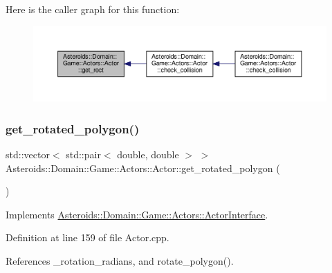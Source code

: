 Here is the caller graph for this function\+:\nopagebreak
\begin{figure}[H]
\begin{center}
\leavevmode
\includegraphics[width=350pt]{classAsteroids_1_1Domain_1_1Game_1_1Actors_1_1Actor_a445d9ee9ca02625b5385727aa4cbab1b_icgraph}
\end{center}
\end{figure}
\mbox{\label{classAsteroids_1_1Domain_1_1Game_1_1Actors_1_1Actor_a8518140e16304bd6cf7a8bc6a99c9509}} 
\subsubsection{\texorpdfstring{get\+\_\+rotated\+\_\+polygon()}{get\_rotated\_polygon()}}
{\footnotesize\ttfamily std\+::vector$<$ std\+::pair$<$ double, double $>$ $>$ Asteroids\+::\+Domain\+::\+Game\+::\+Actors\+::\+Actor\+::get\+\_\+rotated\+\_\+polygon (\begin{DoxyParamCaption}{ }\end{DoxyParamCaption})\hspace{0.3cm}{\ttfamily [virtual]}}



Implements \hyperlink{classAsteroids_1_1Domain_1_1Game_1_1Actors_1_1ActorInterface_ad6a8faa5ca09697f5614a94db525e6f0}{Asteroids\+::\+Domain\+::\+Game\+::\+Actors\+::\+Actor\+Interface}.



Definition at line 159 of file Actor.\+cpp.



References \+\_\+rotation\+\_\+radians, and rotate\+\_\+polygon().

